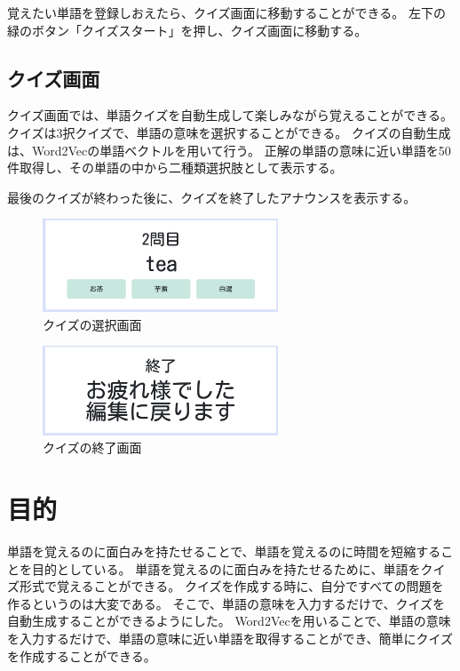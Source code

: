 \documentclass[11pt,a4paper]{jsarticle}
\begin{document}
覚えたい単語を登録しおえたら、クイズ画面に移動することができる。
左下の緑のボタン「クイズスタート」を押し、クイズ画面に移動する。

\subsection{クイズ画面}
クイズ画面では、単語クイズを自動生成して楽しみながら覚えることができる。
クイズは3択クイズで、単語の意味を選択することができる。
クイズの自動生成は、Word2Vecの単語ベクトルを用いて行う。
正解の単語の意味に近い単語を50件取得し、その単語の中から二種類選択肢として表示する。

最後のクイズが終わった後に、クイズを終了したアナウンスを表示する。


\begin{figure}[htbp]
    \begin{center}
        \includegraphics[width=70mm]{./img/question.png}
    \end{center}
    \caption{クイズの選択画面}
\end{figure}


\begin{figure}[htbp]
    \begin{center}
        \includegraphics[width=70mm]{./img/question_end.png}
    \end{center}
    \caption{クイズの終了画面}
\end{figure}



\section{目的}

単語を覚えるのに面白みを持たせることで、単語を覚えるのに時間を短縮することを目的としている。
単語を覚えるのに面白みを持たせるために、単語をクイズ形式で覚えることができる。
クイズを作成する時に、自分ですべての問題を作るというのは大変である。
そこで、単語の意味を入力するだけで、クイズを自動生成することができるようにした。
Word2Vecを用いることで、単語の意味を入力するだけで、単語の意味に近い単語を取得することができ、簡単にクイズを作成することができる。
\end{document}
